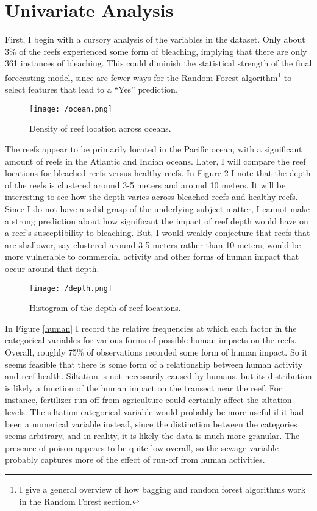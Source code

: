 \documentclass{article}
\begin{document}
\section{Univariate Analysis}

First, I begin with a cursory analysis of the variables in the dataset. Only about 3\% of the reefs experienced some form of bleaching, implying that there are only 361 instances of bleaching. This could diminish the statistical strength of the final forecasting model, since are fewer ways for the Random Forest algorithm\footnote{I give a general overview of how bagging and random forest algorithms work in the Random Forest section.} to select features that lead to a ``Yes'' prediction. 

\begin{figure}[!htb]
    \centering
    \texttt{[image: /ocean.png]}
    \caption{Density of reef location across oceans.}
    \label{ocean}
\end{figure}

The reefs appear to be primarily located in the Pacific ocean, with a significant amount of reefs in the Atlantic and Indian oceans. Later, I will compare the reef locations for bleached reefs versus healthy reefs. In Figure \ref{depth} I note that the depth of the reefs is clustered around 3-5 meters and around 10 meters. It will be interesting to see how the depth varies across bleached reefs and healthy reefs. Since I do not have a solid grasp of the underlying subject matter, I cannot make a strong prediction about how significant the impact of reef depth would have on a reef's susceptibility to bleaching. But, I would weakly conjecture that reefs that are shallower, say clustered around 3-5 meters rather than 10 meters, would be more vulnerable to commercial activity and other forms of human impact that occur around that depth. 

\begin{figure}[!htb]
    \centering
    \texttt{[image: /depth.png]}
    \caption{Histogram of the depth of reef locations.}
    \label{depth}
\end{figure}

In Figure \ref{human} I record the relative frequencies at which each factor in the categorical variables for various forms of possible human impacts on the reefs. Overall, roughly 75\% of observations recorded some form of human impact. So it seems feasible that there is some form of a relationship between human activity and reef health. Siltation is not necessarily caused by humans, but its distribution is likely a function of the human impact on the transect near the reef. For instance, fertilizer run-off from agriculture could certainly affect the siltation levels. The siltation categorical variable would probably be more useful if it had been a numerical variable instead, since the distinction between the categories seems arbitrary, and in reality, it is likely the data is much more granular. The presence of poison appears to be quite low overall, so the sewage variable probably captures more of the effect of run-off from human activities. 
\end{document}
